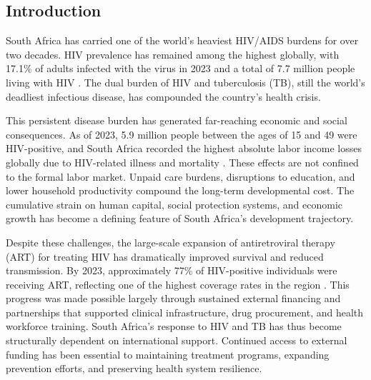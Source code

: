 \documentclass[letterpaper,12pt]{article}
\theoremstyle{definition}
\begin{document}
\begin{spacing}{1.5}


\newpage

\section{Introduction}\label{SecIntro}

South Africa has carried one of the world's heaviest HIV/AIDS burdens for over two decades. HIV prevalence has remained among the highest globally, with 17.1\% of adults infected with the virus in 2023 and a total of 7.7 million people living with HIV \citep{UNAIDSData2024}. The dual burden of HIV and tuberculosis (TB), still the world's deadliest infectious disease, has compounded the country's health crisis.

This persistent disease burden has generated far-reaching economic and social consequences. As of 2023, 5.9 million people between the ages of 15 and 49 were HIV-positive, and South Africa recorded the highest absolute labor income losses globally due to HIV-related illness and mortality \citep{ILO2018}. These effects are not confined to the formal labor market. Unpaid care burdens, disruptions to education, and lower household productivity compound the long-term developmental cost. The cumulative strain on human capital, social protection systems, and economic growth has become a defining feature of South Africa's development trajectory.

Despite these challenges, the large-scale expansion of antiretroviral therapy (ART) for treating HIV has dramatically improved survival and reduced transmission. By 2023, approximately 77\% of HIV-positive individuals were receiving ART, reflecting one of the highest coverage rates in the region \citep{UNAIDSData2024}. This progress was made possible largely through sustained external financing and partnerships that supported clinical infrastructure, drug procurement, and health workforce training. South Africa's response to HIV and TB has thus become structurally dependent on international support. Continued access to external funding has been essential to maintaining treatment programs, expanding prevention efforts, and preserving health system resilience.


\end{spacing}
\end{document}
